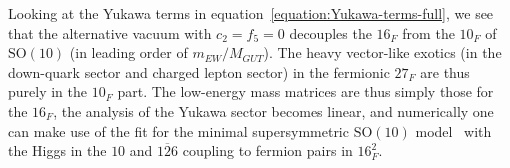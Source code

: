 \documentclass[a4paper,12pt]{article}
\def\SO{\mathrm{SO}}
\begin{document}
Looking at the Yukawa terms in equation~\eqref{equation:Yukawa-terms-full}, we see that the alternative vacuum with $c_2=f_5=0$ decouples the $16_F$ from the $10_F$ of $\SO(10)$ (in leading order of $m_{EW}/M_{GUT}$). The heavy vector-like exotics (in the down-quark sector and charged lepton sector) in the fermionic $27_F$ are thus purely in the $10_F$ part. The low-energy mass matrices are thus simply those for the $16_F$, the analysis of the Yukawa sector becomes linear, and numerically one can make use of the fit for the minimal supersymmetric $\SO(10)$ model~\cite{Babu:1992ia,Bajc:2001fe,Fukuyama:2002ch,Bajc:2002iw,Goh:2003sy,Goh:2003hf,Bertolini:2004eq,Babu:2005ia,Bertolini:2006pe,Bajc:2008dc,Joshipura:2011nn,Altarelli:2013aqa,Dueck:2013gca} with the Higgs in the $10$ and $\overline{126}$ coupling to fermion pairs in $16_F^2$.
\end{document}
